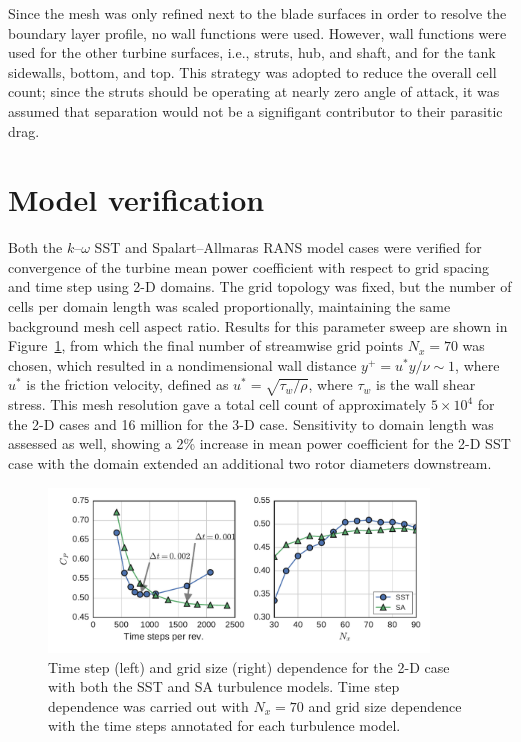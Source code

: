 \documentclass[aip,graphicx]{revtex4-1}
\begin{document}
Since the mesh was only refined next to the blade surfaces in order to resolve
the boundary layer profile, no wall functions were used. However, wall functions
were used for the other turbine surfaces, i.e., struts, hub, and shaft, and for
the tank sidewalls, bottom, and top. This strategy was adopted to reduce the
overall cell count; since the struts should be operating at nearly zero angle of
attack, it was assumed that separation would not be a signifigant contributor to
their parasitic drag.


\section{Model verification}

Both the $k$--$\omega$ SST and Spalart--Allmaras RANS model cases were verified
for convergence of the turbine mean power coefficient with respect to grid
spacing and time step using 2-D domains. The grid topology was fixed, but the
number of cells per domain length was scaled proportionally, maintaining the
same background mesh cell aspect ratio. Results for this parameter sweep are
shown in Figure~\ref{fig:2d-br-verification}, from which the final number of
streamwise grid points $N_x = 70$ was chosen, which resulted in a nondimensional
wall distance $y^+ = u^* y / \nu \sim 1$, where $u^*$ is the friction velocity,
defined as $u^*=\sqrt{\tau_w / \rho}$, where $\tau_w$ is the wall shear stress.
This mesh resolution gave a total cell count of approximately $5 \times 10^4$
for the 2-D cases and 16 million for the 3-D case. Sensitivity to domain length
was assessed as well, showing a 2\% increase in mean power coefficient for the
2-D SST case with the domain extended an additional two rotor diameters
downstream.

\begin{figure}
    \centering

    \includegraphics[width=0.9\textwidth]{verification}

    \caption{Time step (left) and grid size (right) dependence for the 2-D case
    with both the SST and SA turbulence models. Time step dependence was carried
    out with $N_x=70$ and grid size dependence with the time steps annotated for
    each turbulence model.}

    \label{fig:2d-br-verification}
\end{figure}
\end{document}
